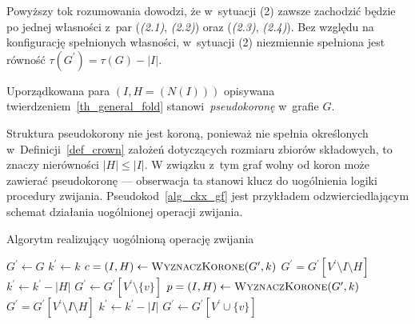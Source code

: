 {\begin{bproof}
\begin{itemize}
      Powyższy tok rozumowania dowodzi, że w~sytuacji (2) zawsze zachodzić będzie po jednej własności z~par (\textit{(2.1)}, \textit{(2.2)}) oraz (\textit{(2.3)}, \textit{(2.4)}).
      Bez względu na konfigurację spełnionych własności, w~sytuacji (2) niezmiennie spełniona jest równość $\tau(G^\prime)=\tau(G)-|I|$.
    \end{itemize}
  \end{bproof}

  \begin{definition}
    Uporządkowana para $(I, H=(N(I)))$ opisywana twierdzeniem~\ref{th_general_fold} stanowi~\emph{pseudokoronę} w~grafie $G$.
  \end{definition}

  Struktura pseudokorony nie jest koroną, ponieważ nie spełnia określonych w~Definicji~\ref{def_crown} założeń dotyczących rozmiaru zbiorów składowych, to znaczy nierówności $|H| \leq |I|$.
  W związku z~tym graf wolny od koron może zawierać pseudokoronę --- obserwacja ta stanowi klucz do uogólnienia logiki procedury zwijania.
  Pseudokod~\ref{alg_ckx_gf} jest przykładem odzwierciedlającym schemat działania uogólnionej operacji zwijania.
  \begin{algorithm}
    \caption{Algorytm realizujący uogólnioną operację zwijania}\label{alg_ckx_gf}
    \begin{algorithmic}[1]


        \State $G^\prime \gets G$
        \State $k^\prime \gets k$
        \State $c=(I, H) \gets \Call{WyznaczKorone}{G^\prime, k}$
          \State $G^\prime = G^\prime[V^\prime \setminus I \setminus H]$
          \State $k^\prime \gets k^\prime - |H|$
        \EndWhile
          \State $G^\prime \gets G^\prime[V^\prime \setminus \{v\}]$
          \State $p=(I, H) \gets \Call{WyznaczKorone}{G^\prime, k}$
            \State $G^\prime = G^\prime[V^\prime \setminus I \setminus H]$
            \State $k^\prime \gets k^\prime - |I|$
          \EndIf
          \State $G^\prime \gets G^\prime[V^\prime \cup \{v\}]$
        \EndFor
      \EndFunction
    \end{algorithmic}
  \end{algorithm}
}

